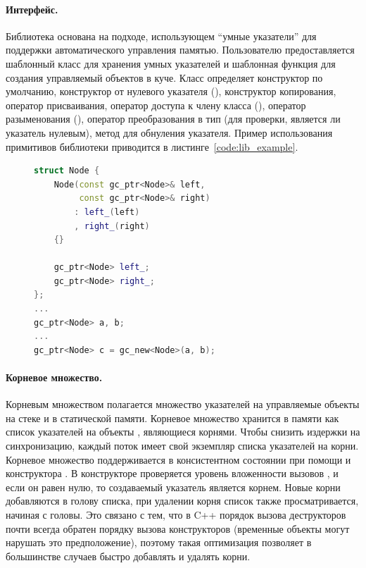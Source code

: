 \paragraph{Интерфейс.}
Библиотека основана на подходе, использующем ``умные указатели'' для поддержки 
автоматического управления памятью. 
Пользователю предоставляется шаблонный класс  для хранения умных 
указателей и шаблонная функция  для создания управляемый объектов в куче. 
Класс  определяет конструктор по умолчанию, конструктор от нулевого указателя 
(), конструктор копирования, оператор присваивания, оператор доступа к члену 
класса (), оператор разыменования (), оператор 
преобразования в тип  (для проверки, является ли указатель нулевым), 
метод  для обнуления указателя. 
Пример использования примитивов библиотеки приводится в листинге~\ref{code:lib_example}. 

\begin{figure}[h!]
\begin{lstlisting}[language={c++}, caption={Пример использования примитивов библиотеки}, 
label={code:lib_example}]
struct Node {
    Node(const gc_ptr<Node>& left, 
         const gc_ptr<Node>& right)
        : left_(left)
        , right_(right)
    {}
    
    gc_ptr<Node> left_;
    gc_ptr<Node> right_;
};
...
gc_ptr<Node> a, b;
...
gc_ptr<Node> c = gc_new<Node>(a, b);
\end{lstlisting}
\end{figure}

\paragraph{Корневое множество.}
Корневым множеством полагается множество указателей на управляемые объекты на стеке и 
в статической памяти. 
Корневое множество хранится в памяти как список указателей на объекты , 
являющиеся корнями. 
Чтобы снизить издержки на синхронизацию, каждый поток имеет свой экземпляр списка 
указателей на корни. 
Корневое множество поддерживается в консистентном состоянии при помощи  и 
конструктора . 
В конструкторе  проверяется уровень вложенности вызовов , и 
если он равен нулю, то создаваемый указатель является корнем. 
Новые корни добавляются в голову списка, при удалении корня список также просматривается, 
начиная с головы. 
Это связано с тем, что в C++ порядок вызова деструкторов почти всегда обратен порядку 
вызова конструкторов (временные объекты могут нарушать это предположение), поэтому такая 
оптимизация позволяет в большинстве случаев быстро добавлять и удалять корни.

